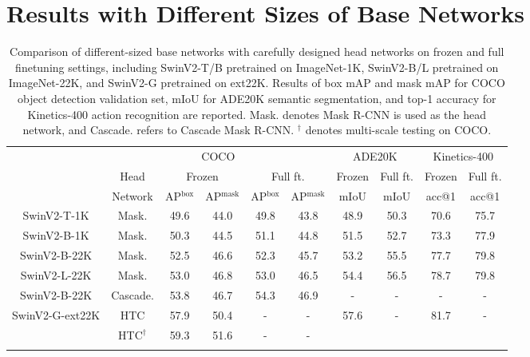 \documentclass{article}
\begin{document}
\section{Results with Different Sizes of Base Networks}
\label{sec:different_size_result}

\begin{table}[htb]
        \centering
        \addtolength{\tabcolsep}{-2.5pt}
        \begin{tabular}{c|ccccc|cc|cc}
            \Xhline{1.0pt}
            \multirow{3}{*}{Base Network} & \multicolumn{5}{c|}{COCO} & \multicolumn{2}{c|}{ADE20K} & \multicolumn{2}{c}{Kinetics-400}\\
            & {Head} &  \multicolumn{2}{c}{Frozen}& \multicolumn{2}{c|}{Full ft.} & Frozen & Full ft. & Frozen & Full ft. \\
            & Network &  AP$^\text{box}$ & AP$^\text{mask}$ & AP$^\text{box}$ & AP$^\text{mask}$ & mIoU & mIoU & acc@1 & acc@1 \\
            \hline
            SwinV2-T-1K & Mask.  & 49.6 & 44.0 & 49.8 & 43.8 & 48.9 & 50.3 &  70.6 & 75.7  \\
            SwinV2-B-1K & Mask. & 50.3 & 44.5 & 51.1 & 44.8 & 51.5 & 52.7 & 73.3 & 77.9  \\
            SwinV2-B-22K & Mask. & 52.5 & 46.6 & 52.3 & 45.7 & 53.2 & 55.5 & 77.7 & 79.8 \\
            SwinV2-L-22K & Mask.  & 53.0 & 46.8 & 53.0 & 46.5 & 54.4 & 56.5 & 78.7 & 79.8 \\
            \hline
            SwinV2-B-22K & Cascade.  & 53.8 & 46.7 & 54.3 & 46.9 &- & - & -&- \\
            \multirow{2}{*}{SwinV2-G-ext22K} & HTC  & 57.9 & 50.4 & - & - & \multirow{2}{*}{57.6} & \multirow{2}{*}{-}& \multirow{2}{*}{81.7} & \multirow{2}{*}{-} \\
             & HTC$^\dag$  & 59.3 & 51.6 & - & - &  & &  & \\
          \Xhline{1.0pt}  
       \end{tabular}
     \caption{Comparison of different-sized base networks with carefully designed head networks on frozen and full finetuning settings, including SwinV2-T/B pretrained on ImageNet-1K,  SwinV2-B/L pretrained on ImageNet-22K, and SwinV2-G pretrained on ext22K. Results of box mAP and mask mAP for COCO object detection validation set, mIoU for ADE20K semantic segmentation, and top-1 accuracy for Kinetics-400 action recognition are reported. Mask. denotes Mask R-CNN is used as the head network, and Cascade. refers to Cascade Mask R-CNN. $^\dag$ denotes multi-scale testing on COCO.}
     \label{tab:3b}
\end{table}
\end{document}
